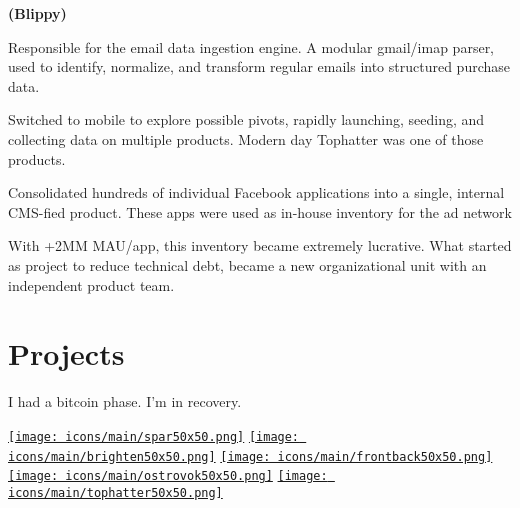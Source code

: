 \documentclass[]{plushcv}
\begin{document}
\begin{minipage}[t]{0.70\textwidth}
 \textbf{(Blippy)}
\begin{tightemize}
\item Responsible for the email data ingestion engine. A modular gmail/imap parser, used to identify, normalize, and transform regular emails into structured purchase data.
\item Switched to mobile to explore possible pivots, rapidly launching, seeding, and collecting data on multiple products. Modern day Tophatter was one of those products.
\end{tightemize}
\sectionsep

\begin{tightemize}
\item Consolidated hundreds of individual Facebook applications into a single, internal CMS-fied  product. These apps were used as in-house inventory for the ad network  
\item With +2MM MAU/app, this inventory became extremely lucrative.  What started as project to reduce technical debt, became a new organizational unit with an independent product team.
\end{tightemize}
\sectionsep





\section{Projects}

\begin{tightemize}
\item I had a bitcoin phase. I'm in recovery. 
\end{tightemize}
\sectionsep

\sectionsep
\sectionsep
\sectionsep
\sectionsep
\href{https://getspar.com}{\texttt{[image: icons/main/spar50x50.png]}}\hspace{0.3cm}
\href{https://www.nytimes.com/2016/12/20/fashion/austin-kevitch-brighten-app-anti-bullying.html}{\texttt{[image: icons/main/brighten50x50.png]}}\hspace{0.3cm}
\href{https://www.businessinsider.com/frontback-the-once-hot-startup-that-rejected-a-40-million-twitter-acquisition-is-back-from-the-dead-2015-7}{\texttt{[image: icons/main/frontback50x50.png]}}\hspace{0.3cm}
\href{https://apps.apple.com/us/app/ostrovok-ru-hotel-deals/id564204730}{\texttt{[image: icons/main/ostrovok50x50.png]}}\hspace{0.3cm}
\href{https://tophatter.com}{\texttt{[image: icons/main/tophatter50x50.png]}}



\end{minipage} 
\end{document}
